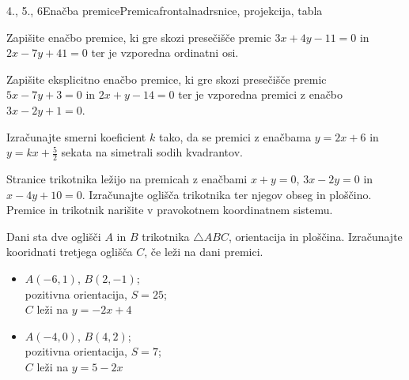 \begin{priprava}{4., 5., 6}{}{Enačba premice}{Premica}{frontalna}{drsnice, projekcija, tabla}
            
            \begin{naloga}
                Zapišite enačbo premice, ki gre skozi presečišče premic $3x+4y-11=0$ in $2x-7y+41=0$ ter je vzporedna ordinatni osi.
            \end{naloga}

            \begin{naloga}
                Zapišite eksplicitno enačbo premice, ki gre skozi presečišče premic $5x-7y+3=0$ in $2x+y-14=0$ ter je vzporedna premici z enačbo $3x-2y+1=0$.
            \end{naloga}

            \begin{naloga}
                Izračunajte smerni koeficient $k$ tako, da se premici z enačbama $y=2x+6$ in $y=kx+\frac{5}{2}$ sekata na simetrali sodih kvadrantov.
            \end{naloga}
            
            \begin{naloga}
                Stranice trikotnika ležijo na premicah z enačbami $x+y=0$, $3x-2y=0$ in $x-4y+10=0$. 
                Izračunajte oglišča trikotnika ter njegov obseg in ploščino.
                Premice in trikotnik narišite v pravokotnem koordinatnem sistemu.
            \end{naloga}

            \begin{naloga}
                Dani sta dve oglišči $A$ in $B$ trikotnika $\triangle ABC$, orientacija in ploščina. Izračunajte kooridnati tretjega oglišča $C$, če leži na dani premici.
                \begin{itemize}
                    \item $A(-6,1)$, $B(2,-1)$; \\ pozitivna orientacija, $S=25$; \\ $C$ leži na $y=-2x+4$
                    \item $A(-4,0)$, $B(4,2)$; \\ pozitivna orientacija, $S=7$; \\ $C$ leži na $y=5-2x$
                \end{itemize}
            \end{naloga}



\end{priprava}